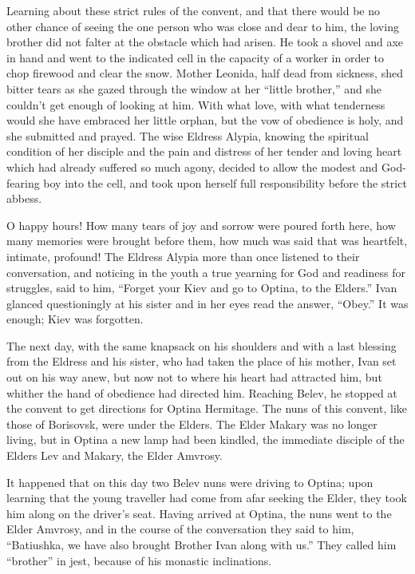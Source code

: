 Learning about these strict rules of the convent, and that there would be no other chance of seeing the one person who was close and dear to him, the loving brother did not falter at the obstacle which had arisen. He took a shovel and axe in hand and went to the indicated cell in the capacity of a worker in order to chop firewood and clear the snow. Mother Leonida, half dead from sickness, shed bitter tears as she gazed through the window at her ``little brother,'' and she couldn't get enough of looking at him. With what love, with what tenderness would she have embraced her little orphan, but the vow of obedience is holy, and she submitted and prayed. The wise Eldress Alypia, knowing the spiritual condition of her disciple and the pain and distress of her tender and loving heart which had already suffered so much agony, decided to allow the modest and God-fearing boy into the cell, and took upon herself full responsibility before the strict abbess.

O happy hours! How many tears of joy and sorrow were poured forth here, how many memories were brought before them, how much was said that was heartfelt, intimate, profound! The Eldress Alypia more than once listened to their conversation, and noticing in the youth a true yearning for God and readiness for struggles, said to him, ``Forget your Kiev and go to Optina, to the Elders.'' Ivan glanced questioningly at his sister and in her eyes read the answer, ``Obey.'' It was enough; Kiev was forgotten.

The next day, with the same knapsack on his shoulders and with a last blessing from the Eldress and his sister, who had taken the place of his mother, Ivan set out on his way anew, but now not to where his heart had attracted him, but whither the hand of obedience had directed him. Reaching Belev, he stopped at the convent to get directions for Optina Hermitage. The nuns of this convent, like those of Borisovsk, were under the Elders. The Elder Makary was no longer living, but in Optina a new lamp had been kindled, the immediate disciple of the Elders Lev and Makary, the Elder Amvrosy.

It happened that on this day two Belev nuns were driving to Optina; upon learning that the young traveller had come from afar seeking the Elder, they took him along on the driver's seat. Having arrived at Optina, the nuns went to the Elder Amvrosy, and in the course of the conversation they said to him, ``Batiushka, we have also brought Brother Ivan along with us.'' They called him ``brother'' in jest, because of his monastic inclinations.

